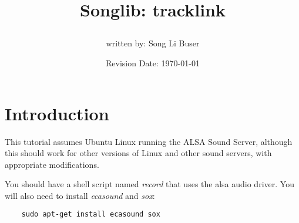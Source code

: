 \documentclass{article}
\title{Songlib: tracklink\\
\date{Revision Date: \today}}
\author{written by: Song Li Buser}
\begin{document}
\maketitle

\W\subsubsection*{}
\W\htmlrule

\section*{Introduction}

This tutorial assumes Ubuntu Linux running the ALSA Sound Server,
although this should work for other versions of Linux and
other sound servers, with appropriate modifications.

You should have a shell script named {\it record}
that uses the alsa audio driver.
You will also need to install {\it ecasound} and {\it sox}:

\begin{verbatim}
    sudo apt-get install ecasound sox
\end{verbatim}
\end{document}

